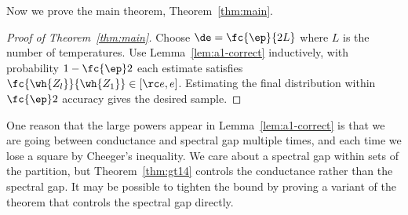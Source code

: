 %

Now we prove the main theorem, Theorem~\ref{thm:main}.
\begin{proof}[Proof of Theorem~\ref{thm:main}]
Choose $\de=\fc{\ep}{2L}$ where $L$ is the number of temperatures. 
Use Lemma~\ref{lem:a1-correct} inductively, with probability $1-\fc{\ep}2$ each estimate satisfies $\fc{\wh{Z_l}}{\wh{Z_1}}\in [\rc e,e]$. Estimating the final distribution within $\fc{\ep}2$ accuracy gives the desired sample.
\end{proof}

\begin{rem}
One reason that the large powers appear in Lemma~\ref{lem:a1-correct} is that we are going between conductance and spectral gap multiple times, and each time we lose a square by Cheeger's inequality. We care about a spectral gap within sets of the partition, but Theorem~\ref{thm:gt14} controls the conductance rather than the spectral gap. It may be possible to tighten the bound by proving a variant of the theorem that controls the spectral gap directly.
\end{rem}

